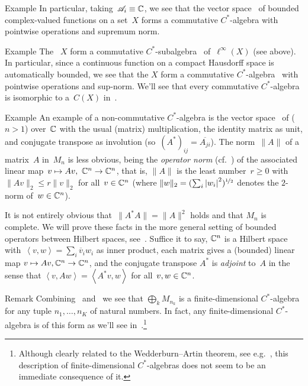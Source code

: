 \documentclass[a]{subfiles}
\begin{document}
\begin{parsec}
\begin{point}{Example}
In particular,
taking~$\mathscr{A}_i\equiv \mathbb{C}$,
we see that
the vector space~%
%
of bounded complex-valued functions
on a set~$X$ forms a commutative $C^*$-algebra
with pointwise operations and supremum norm.
\end{point}
\begin{point}{Example}%
The ~$X$
form a commutative $C^*$-subalgebra~%
of~$\ell^\infty(X)$ (see above).
In particular,
since a continuous function on a compact Hausdorff space is 
automatically bounded,
we see that the  $X$
form a commutative $C^*$-algebra~%
%
with pointwise operations and sup-norm.
We'll see that every commutative $C^*$-algebra
is isomorphic to a~$C(X)$
in~.
\end{point}
\begin{point}{Example}%
An example of a non-commutative
$C^*$-algebra
is
the vector space~%
of  ($n>1$) over~$\mathbb{C}$
with the usual (matrix) multiplication,
the identity matrix as unit,
and conjugate transpose
as involution
(so~$(A^*)_{ij} = \overline{A_{ji}}$).
The norm~$\|A\|$ of a matrix~$A$ in~$M_n$
is less obvious,
being
the \emph{operator norm}
(cf.~)
of the associated linear map~$v\mapsto Av,\ \C^n\to\C^n$,
that is,
$\|A\|$ is
the least number~$r\geq 0$
with $\|Av\|_2\leq r\|v\|_2$
for all~$v\in \mathbb{C}^n$
(where $\|w\|_2=(\sum_i \left|w_i\right|^2)^{\nicefrac{1}{2}}$
denotes the $2$-norm
of~$w\in \mathbb{C}^n$).

It is not entirely obvious that~$\|A^*A\|=\|A\|^2$
holds
and that $M_n$ is complete.
We will prove these facts in the more general setting
of bounded operators between Hilbert spaces, 
see~.
Suffice it to say, $\mathbb{C}^n$ is a Hilbert space
with~$\left<v,w\right>=\sum_i \overline{v}_iw_i$
as inner product,
each matrix gives a (bounded) linear map $v\mapsto Av,\mathbb{C}^n\to \mathbb{C}^n$,
and the conjugate transpose $A^*$ is \emph{adjoint} to~$A$
in the sense that $\left<v,Aw\right> = \left<A^*v,w\right>$
for all~$v,w\in\mathbb{C}^n$.
\end{point}
\begin{point}{Remark}%
Combining~
and~
we see that
$\bigoplus_k M_{n_k}$
is a finite-dimensional
$C^*$-algebra
for any tuple $n_1,\dotsc,n_K$
of natural numbers.
In fact,
any finite-dimensional $C^*$-algebra
is of this form
as we'll see in~.\footnote{Although
clearly related to the 
Wedderburn--Artin theorem,
see e.g.~\cite{nicholson1993},
this description of finite-dimensional
$C^*$-algebras
does not seem to be an immediate consequence of it.}
\end{point}
\end{parsec}
\end{document}
